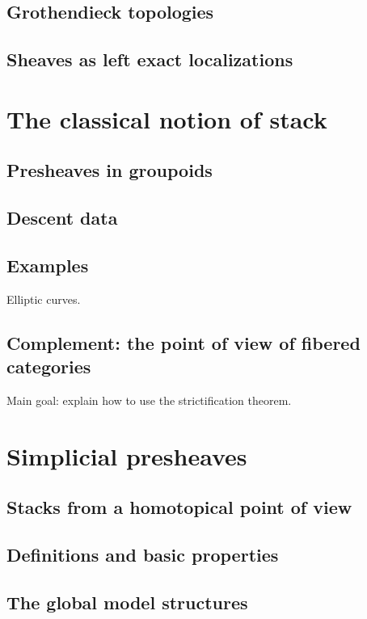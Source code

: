 \begin{refsection}
\subsection{Grothendieck topologies}

\subsection{Sheaves as left exact localizations}

\section{The classical notion of stack}

\subsection{Presheaves in groupoids}

\subsection{Descent data}

\subsection{Examples}

Elliptic curves.

\subsection{Complement: the point of view of fibered categories}

Main goal: explain how to use the strictification theorem.

\section{Simplicial presheaves}

\subsection{Stacks from a homotopical point of view}

\subsection{Definitions  and basic properties}

\subsection{The global model structures}


\end{refsection}

